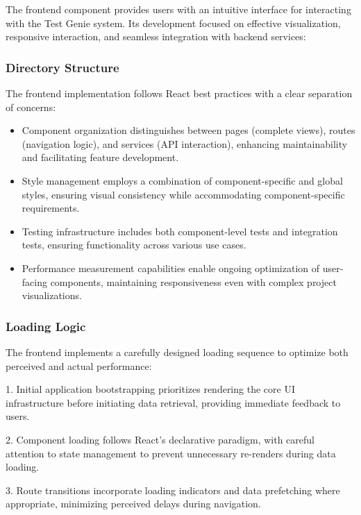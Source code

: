 The frontend component provides users with an intuitive interface for interacting with the Test Genie system. Its development focused on effective visualization, responsive interaction, and seamless integration with backend services:

\subsubsection{Directory Structure}

The frontend implementation follows React best practices with a clear separation of concerns:

\begin{itemize}
    \item Component organization distinguishes between pages (complete views), routes (navigation logic), and services (API interaction), enhancing maintainability and facilitating feature development.
    
    \item Style management employs a combination of component-specific and global styles, ensuring visual consistency while accommodating component-specific requirements.
    
    \item Testing infrastructure includes both component-level tests and integration tests, ensuring functionality across various use cases.
    
    \item Performance measurement capabilities enable ongoing optimization of user-facing components, maintaining responsiveness even with complex project visualizations.
\end{itemize}

\subsubsection{Loading Logic}

The frontend implements a carefully designed loading sequence to optimize both perceived and actual performance:

1. Initial application bootstrapping prioritizes rendering the core UI infrastructure before initiating data retrieval, providing immediate feedback to users.

2. Component loading follows React's declarative paradigm, with careful attention to state management to prevent unnecessary re-renders during data loading.

3. Route transitions incorporate loading indicators and data prefetching where appropriate, minimizing perceived delays during navigation.

